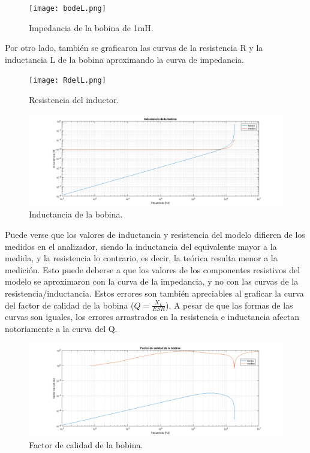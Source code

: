 \begin{figure}[h!]
\centering
\texttt{[image: bodeL.png]}
\caption{Impedancia de la bobina de 1mH.}
\label{fig:bodeL}
\end{figure}

Por otro lado, también se graficaron las curvas de la resistencia R y la inductancia L de la bobina aproximando la curva de impedancia.

\begin{figure}[h!]
\centering
\texttt{[image: RdelL.png]}
\caption{Resistencia del inductor.}
\label{fig:RdelL}
\end{figure}

\begin{figure}[h!]
\centering
\includegraphics[scale=0.5]{LdelL.png}
\caption{Inductancia de la bobina.}
\label{fig:LdelL}
\end{figure}

Puede verse que los valores de inductancia y resistencia del modelo difieren de los medidos en el analizador, siendo la inductancia del equivalente mayor a la medida, y la resistencia lo contrario, es decir, la teórica resulta menor a la medición.  Esto puede deberse a que los valores de los componentes resistivos del modelo se aproximaron con la curva de la impedancia, y no con las curvas de la resistencia/inductancia.
Estos errores son también apreciables al graficar la curva del factor de calidad de la bobina ($Q=\frac{X_L}{ESR}$). A pesar de que las formas de las curvas son iguales, los errores arrastrados en la resistencia e inductancia afectan notoriamente a la curva del Q.

\begin{figure}[h!]
\centering
\includegraphics[scale=0.5]{QdelL.png}
\caption{Factor de calidad de la bobina.}
\label{fig:QdelL}
\end{figure}

